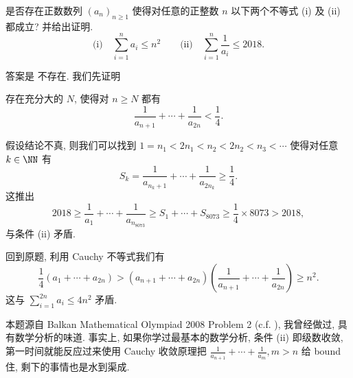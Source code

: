 \newpage

\begin{prob}
\label{prob:prob-11}
是否存在正数数列 $(a_n)_{n \ge 1}$ 使得对任意的正整数 $n$
以下两个不等式 (i) 及 (ii) 都成立? 并给出证明.
\[
\text{(i)} \quad \sum_{i=1}^n a_i \le n^2 \qquad
\text{(ii)} \quad \sum_{i=1}^n \frac{1}{a_i}\le 2018.
\]
\end{prob}

\begin{soln}
答案是 $\boxed{\text{不存在.}}$ 我们先证明

\begin{lem}
存在充分大的 $N$, 使得对 $n \ge N$ 都有
\[
\frac{1}{a_{n+1}} + \cdots + \frac{1}{a_{2n}} < \frac{1}{4}.
\]
\end{lem}

\begin{subproof}
假设结论不真, 则我们可以找到
$1 = n_1 < 2n_1 < n_2 < 2n_2 < n_3 < \cdots$ 使得对任意 $k \in \NN$ 有
\[
S_k = \frac{1}{a_{n_k+1}} + \cdots + \frac{1}{a_{2n_k}} \ge \frac{1}{4}.
\]
这推出
\[
2018 \ge \frac{1}{a_1} + \cdots + \frac{1}{a_{n_{8073}}}
     \ge S_1 + \cdots + S_{8073}
     \ge \frac{1}{4} \times 8073 > 2018,
\]
与条件 (ii) 矛盾.
\end{subproof}

回到原题, 利用 Cauchy 不等式我们有
\[
\frac{1}{4}(a_1 + \cdots + a_{2n}) > (a_{n+1} + \cdots +a_{2n})
\left(\frac{1}{a_{n+1}} + \cdots + \frac{1}{a_{2n}}\right) \ge n^2.
\]
这与 $\sum_{i=1}^{2n} a_i \le 4n^2$ 矛盾.
\end{soln}

\begin{rem*}
本题源自 Balkan Mathematical Olympiad 2008 Problem 2 (c.f. \cite{balkan-2018}),
我曾经做过, 具有数学分析的味道. 事实上, 如果你学过最基本的数学分析,
条件 (ii) 即级数收敛, 第一时间就能反应过来使用 Cauchy 收敛原理把
$\frac{1}{a_{n+1}} + \cdots + \frac{1}{a_m}, m > n$ 给 bound 住,
剩下的事情也是水到渠成.
\end{rem*}

